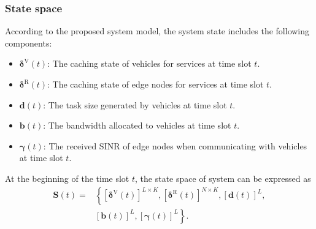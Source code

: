 \documentclass[lettersize,journal]{IEEEtran}
\begin{document}
\subsubsection{State space}
According to the proposed system model, the system state includes the following components:
\begin{itemize}
	\item $ \boldsymbol{\delta}^{\text{V}}(t) $: The caching state of vehicles for services at time slot $ t $.
	\item $ \boldsymbol{\delta}^{\text{R}}(t) $: The caching state of edge nodes for services at time slot $ t $.
	\item $ \mathbf{d}(t) $: The task size generated by vehicles at time slot $ t $.
	\item $ \mathbf{b}(t) $: The bandwidth allocated to vehicles at time slot $ t $.
	\item $ \boldsymbol{\gamma}(t) $: The received SINR of edge nodes when communicating with vehicles at time slot $ t $.
\end{itemize}
At the beginning of the time slot $ t $, the state space of system can be expressed as
\begin{equation}
	\label{equ: state space}
	\begin{aligned}
		\mathbf{S}(t) =  & \left\{ [\boldsymbol{\delta}^{\text{V}}(t)]^{ L \times K},  [\boldsymbol{\delta}^{\text{R}}(t)]^{N \times K},[\mathbf{d}(t)]^{L},  \right.  \\ 
		  & \left.  [\mathbf{b}(t)]^{ L}, [\boldsymbol{\gamma}(t)]^{L} \right\}.
	\end{aligned}
\end{equation}
\end{document}
